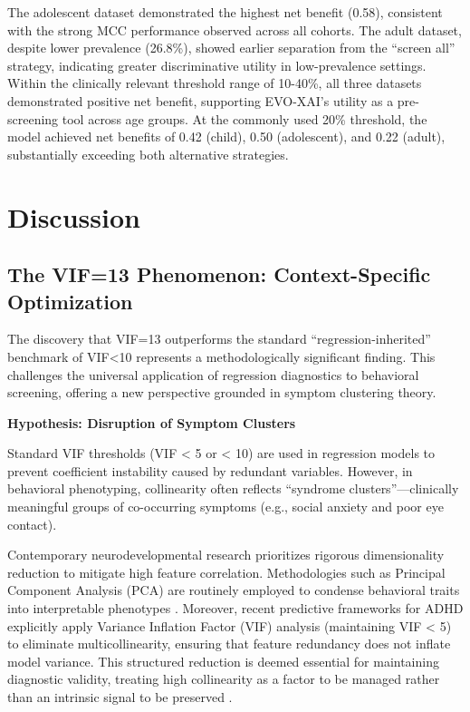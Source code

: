 The adolescent dataset demonstrated the highest net benefit (0.58), consistent with the strong MCC performance observed across all cohorts. The adult dataset, despite lower prevalence (26.8\%), showed earlier separation from the ``screen all'' strategy, indicating greater discriminative utility in low-prevalence settings. Within the clinically relevant threshold range of 10-40\%, all three datasets demonstrated positive net benefit, supporting EVO-XAI's utility as a pre-screening tool across age groups. At the commonly used 20\% threshold, the model achieved net benefits of 0.42 (child), 0.50 (adolescent), and 0.22 (adult), substantially exceeding both alternative strategies.

\FloatBarrier

\section{Discussion}\label{discussion}

\subsection{The VIF=13 Phenomenon: Context-Specific Optimization}\label{the-vif13-phenomenon-context-specific-optimization}

The discovery that VIF=13 outperforms the standard ``regression-inherited'' benchmark of VIF\textless10 represents a methodologically significant finding. This challenges the universal application of regression diagnostics to behavioral screening, offering a new perspective grounded in symptom clustering theory.

\textbf{Hypothesis: Disruption of Symptom Clusters}

Standard VIF thresholds (VIF \textless{} 5 or \textless{} 10) are used in regression models to prevent coefficient instability caused by redundant variables. However, in behavioral phenotyping, collinearity often reflects ``syndrome clusters''---clinically meaningful groups of co-occurring symptoms (e.g., social anxiety and poor eye contact).

Contemporary neurodevelopmental research prioritizes rigorous dimensionality reduction to mitigate high feature correlation. Methodologies such as Principal Component Analysis (PCA) are routinely employed to condense behavioral traits into interpretable phenotypes \cite{ref62,ref63}. Moreover, recent predictive frameworks for ADHD explicitly apply Variance Inflation Factor (VIF) analysis (maintaining VIF \textless{} 5) to eliminate multicollinearity, ensuring that feature redundancy does not inflate model variance\cite{ref64}. This structured reduction is deemed essential for maintaining diagnostic validity, treating high collinearity as a factor to be managed rather than an intrinsic signal to be preserved \cite{ref65}.


